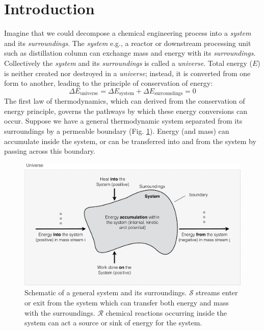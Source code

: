 \documentclass[11pt]{article}
\theoremstyle{definition}
\begin{document}
\clearpage

\section*{Introduction}
Imagine that we could decompose a chemical engineering process into a \textit{system} and its \textit{surroundings}.
The \textit{system} e.g., a reactor or downstream processing unit such as distillation column can exchange mass and energy with its \textit{surroundings}.
Collectively the \textit{system} and its \textit{surroundings} is called a \textit{universe}.
Total energy ($E$) is neither created nor destroyed in a \textit{universe};
instead, it is converted from one form to another, leading to the principle of conservation of energy:
\begin{equation}
	\Delta{E}_{\mathrm{universe}} = \Delta{E}_{\mathrm{system}}+\Delta{E}_{\mathrm{surroundings}} = 0
\end{equation}
The first law of thermodynamics, which can derived from the conservation of energy principle, governs the pathways by which these energy conversions can occur.
Suppose we have a general thermodynamic system separated from its surroundings by a permeable boundary (Fig. \ref{fig-energy-schematic}).
Energy (and mass) can accumulate inside the system, or can be transferred into and from the system by passing across this boundary.
\begin{figure}[!ht]\center
  \includegraphics[width=1.0\textwidth]{./figs/EnergySchematic.pdf}
  \caption{Schematic of a general system and its surroundings. $\mathcal{S}$ streams enter or exit from the system which can transfer both energy and mass with the surroundings.
  $\mathcal{R}$ chemical reactions occurring inside the system can act a source or sink of energy for the system.}
  \label{fig-energy-schematic}
\end{figure}
\end{document}
